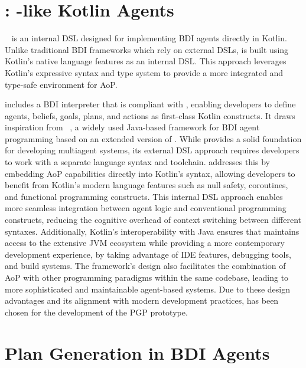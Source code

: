 \documentclass[12pt,a4paper,openright,twoside]{book}
\begin{document}
\section{\jakta{}: \jason{}-like Kotlin Agents}

\jakta{}~\cite{JaktaSNCS2024} is an internal \ac{DSL} designed for implementing \ac{BDI} agents directly in Kotlin. 
%
Unlike traditional \ac{BDI} frameworks which rely on external \acp{DSL}, \jakta{} is built using Kotlin's native language features as an internal DSL.
%
This approach leverages Kotlin's expressive syntax and type system to provide a more integrated and type-safe environment for \ac{AoP}.

\jakta{} includes a \ac{BDI} interpreter that is compliant with \agentspeak{}, enabling developers to define agents, beliefs, goals, plans, and actions as first-class Kotlin constructs.
%
It draws inspiration from \jason{}~\cite{ProgrammingMultiAgentSystems2007}, a widely used Java-based framework for \ac{BDI} agent programming based on an extended version of \agentspeak{}.
%
While \jason{} provides a solid foundation for developing multiagent systems, its external DSL approach requires developers to work with a separate language syntax and toolchain.
%
\jakta{} addresses this by embedding \ac{AoP} capabilities directly into Kotlin's syntax, allowing developers to benefit from Kotlin's modern language features such as null safety, coroutines, and functional programming constructs.
%
This internal DSL approach enables more seamless integration between agent logic and conventional programming constructs, reducing the cognitive overhead of context switching between different syntaxes.
%
Additionally, Kotlin's interoperability with Java ensures that \jakta{} maintains access to the extensive JVM ecosystem while providing a more contemporary development experience, by taking advantage of IDE features, debugging tools, and build systems.
%
The framework's design also facilitates the combination of \ac{AoP} with other programming paradigms within the same codebase, leading to more sophisticated and maintainable agent-based systems.
%
Due to these design advantages and its alignment with modern development practices, \jakta{} has been chosen for the development of the \ac{PGP} prototype.

\section{Plan Generation in BDI Agents}\label{sec:plan-generation}
\end{document}
